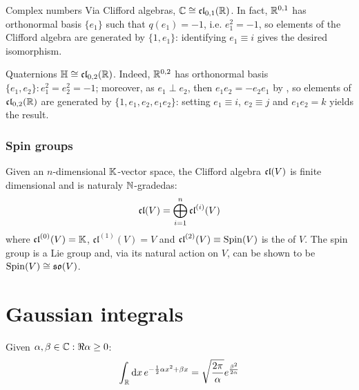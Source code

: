\begin{example}{Complex numbers}{}
  Via Clifford algebras, $ \mathbb{C} \cong \mathfrak{cl}_{0,1}(\mathbb{R}) $. In fact, $ \mathbb{R}^{0,1} $ has orthonormal basis $ \{e_1\} $ such that $ q(e_1) = -1 $, i.e. $ e_1^2 = - \mathit{1} $, so elements of the Clifford algebra are generated by $ \{\mathit{1},e_1\} $: identifying $ e_1 \equiv i $ gives the desired isomorphism.
\end{example}

\begin{example}{Quaternions}{}
  $ \mathbb{H} \cong \mathfrak{cl}_{0,2}(\mathbb{R}) $. Indeed, $ \mathbb{R}^{0,2} $ has orthonormal basis $ \{e_1,e_2\} : e_1^2 = e_2^2 = - \mathit{1} $; moreover, as $ e_1 \perp e_2 $, then $ e_1 e_2 = - e_2 e_1 $ by , so elements of $ \mathfrak{cl}_{0,2}(\mathbb{R}) $ are generated by $ \{\mathit{1},e_1,e_2,e_1 e_2\} $: setting $ e_1 \equiv i $, $ e_2 \equiv j $ and $ e_1 e_2 = k $ yields the result.
\end{example}

\subsubsection{Spin groups}
\label{subsubsec:spin-groups}

Given an $ n $-dimensional $ \mathbb{K} $-vector space, the Clifford algebra $ \mathfrak{cl}(V) $ is finite dimensional and is naturaly $ \mathbb{N} $-graded\footnotemark as:
\begin{equation}
  \mathfrak{cl}(V) = \bigoplus_{i = 1}^n \mathfrak{cl}^{(i)}(V)
  \label{eq:cliff-alg-grade}
\end{equation}
where $ \mathfrak{cl}^{(0)}(V) = \mathbb{K} $, $ \mathfrak{cl}^{(1)}(V) = V $ and $ \mathfrak{cl}^{(2)}(V) \equiv \operatorname{Spin}(V) $ is the  of $ V $. The spin group is a Lie group and, via its natural action on $ V $, can be shown to be $ \operatorname{Spin}(V) \cong \mathfrak{so}(V) $.
%
%
\section{Gaussian integrals}

\begin{lemma}{}{}
  Given $ \alpha , \beta \in \mathbb{C} : \Re{\alpha} \ge 0 $:
  \begin{equation}
    \int_{\mathbb{R}} \mathrm{d} x\, e^{-\frac{1}{2} \alpha x^2 + \beta x} = \sqrt{\frac{2\pi}{\alpha}} e^{\frac{\beta^2}{2\alpha}}
    \label{eq:gauss-int}
  \end{equation}
\end{lemma}










